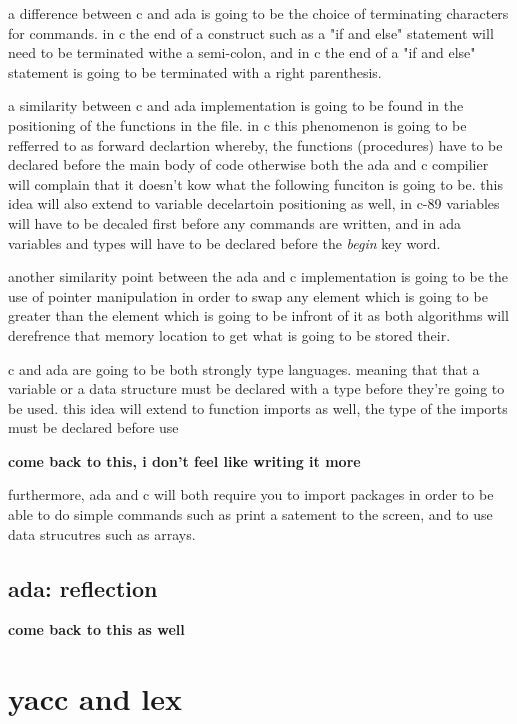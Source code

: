 \documentclass[
	12pt, %
]{fphw}
\begin{document}
a difference between c and ada is going to be the choice of terminating characters
for commands. in c the end of a construct such as a "if and else" statement will
need to be terminated withe a semi-colon, and in c the end of a "if and else"
statement is going to be terminated with a right parenthesis.\par

a similarity between c and ada implementation is going to be found in the
positioning of the functions in the file. in c this phenomenon is going to be
refferred to as forward declartion whereby, the functions (procedures) have to
be declared before the main body of code otherwise both the ada and c compilier
will complain that it doesn't kow what the following funciton is going to be. this
idea will also extend to variable decelartoin positioning as well, in c-89
variables will have to be decaled first before any commands are written, and in
ada variables and types will have to be declared before the \emph{begin} key word.\par

another similarity point between the ada and c implementation is going to be the
use of pointer manipulation in order to swap any element which is going to be greater
than the element which is going to be infront of it as both algorithms will
derefrence that memory location to get what is going to be stored their.\par

c and ada are going to be both strongly type languages. meaning that that a variable
or a data structure must be declared with a type before they're going to be used.
this idea will extend to function imports as well, the type of the imports must be
declared before use

\textbf{come back to this, i don't feel like writing it more}

furthermore, ada and c will both require you to import packages in order to be able
to do simple commands such as print a satement to the screen, and to use data
strucutres such as arrays. \par

\subsection{ada: reflection}
\textbf{come back to this as well}


\section{yacc and lex}
\end{document}
